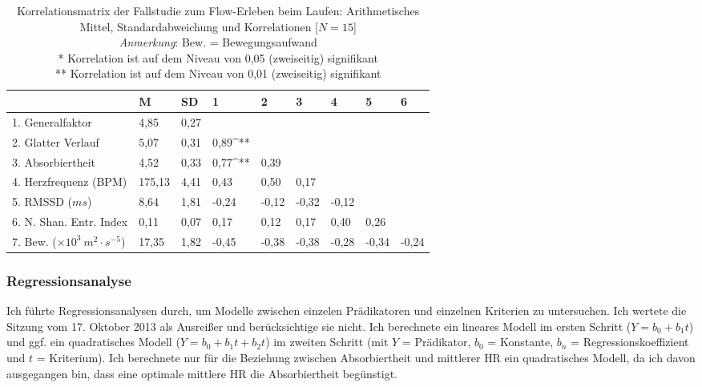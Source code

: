 \begin{sidewaystable}
\centering
	\caption[Korrelationsmatrix (Fallstudie: Laufen)]{Korrelationsmatrix der Fallstudie zum Flow-Erleben beim Laufen: Arithmetisches Mittel, Standardabweichung und Korrelationen [$N = 15$]\\ \hspace{\textwidth} \emph{Anmerkung}: Bew. = Bewegungsaufwand \\ \hspace{\textwidth}* Korrelation ist auf dem Niveau von 0,05 (zweiseitig) signifikant \\ \hspace{\textwidth}** Korrelation ist auf dem Niveau von 0,01 (zweiseitig) signifikant}
	\label{tab:korrelationen_fallstudie_laufen}
\begin{tabular}{lxxxxxxxx}
\toprule
& M & SD & 1 & 2 & 3 & 4 & 5 & 6 \\
. Generalfaktor & 4,85 & 0,27 & & & & & & \\
2. Glatter Verlauf & 5,07 & 0,31 & 0,89^{**} & & & & & \\
3. Absorbiertheit & 4,52 & 0,33 & 0,77^{**} & 0,39 & & & & \\
4. Herzfrequenz (BPM) & 175,13 & 4,41 & 0,43 & 0,50 & 0,17 & & & \\
5. RMSSD ($ms$) & 8,64 & 1,81 & -0,24 & -0,12 & -0,32 & -0,12 & & \\
6. N. Shan. Entr. Index & 0,11 & 0,07 & 0,17 & 0,12 & 0,17 & 0,40 & 0,26 & \\
7. Bew. ($\times 10^3 \: m^2 \cdot s^{-5}$) & 17,35 & 1,82 & -0,45 & -0,38 & -0,38 & -0,28 & -0,34 & -0,24 \\
\bottomrule
\bottomrule
\end{tabular}
\end{sidewaystable}

\subsubsection{Regressionsanalyse}
Ich führte Regressionsanalysen durch, um Modelle zwischen einzelen Prädikatoren und einzelnen Kriterien zu untersuchen. Ich wertete die Sitzung vom 17. Oktober 2013 als Ausreißer und berücksichtige sie nicht. Ich berechnete ein lineares Modell im ersten Schritt ($Y = b_{0} + b_{1}t$) und ggf. ein quadratisches Modell ($Y = b_{0} + b_{1}t + b_{2}t$) im zweiten Schritt (mit $Y$ = Prädikator, $b_{0}$ = Konstante, $b_{n}$ = Regressionskoeffizient und $t$ = Kriterium). Ich berechnete nur für die Beziehung zwischen Absorbiertheit und mittlerer \ac{HR} ein quadratisches Modell, da ich davon ausgegangen bin, dass eine optimale mittlere \ac{HR} die Absorbiertheit begünstigt.

